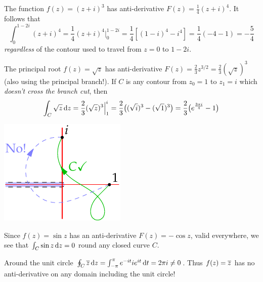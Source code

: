 \begin{examples}{}{}
	\exstart The function $f(z)=(z+i)^3$ has anti-derivative $F(z)=\frac 14(z+i)^4$. It follows that
	\[
		\int_0^{1-2i}(z+i)^4=\frac 14(z+i)^4\Big|_0^{1-2i}=\frac 14\left[(1-i)^4-i^4\right]=\frac 14(-4-1)=-\frac 54
	\]
	\emph{regardless} of the contour used to travel from $z=0$ to $1-2i$.

	\begin{enumerate}\setcounter{enumi}{1}
		\begin{minipage}[t]{0.76\linewidth}\vspace{-10pt}
		\item The principal root $f(z)=\sqrt{z}$ has anti-derivative $F(z)=\frac 23z^{3/2}=\frac 23(\sqrt z)^3$ (also using the principal branch!). If $C$ is any contour from $z_0=1$ to $z_1=i$ which \emph{doesn't cross the branch cut}, then
	  	\[
	  		\int_C\sqrt z\,{\mathrm{d} z}
	  		=\frac 23(\sqrt z)^3\Big|_1^i
	  		=\frac 23\bigl((\sqrt i)^3-(\sqrt 1)^3\bigr)
	  		=\frac 23\bigl(e^{\frac{3\pi i}{4}}-1\bigr)
	  	\]
		\end{minipage}
		\hfill
		\begin{minipage}[t]{0.23\linewidth}\vspace{-10pt}
			\flushright\includegraphics[scale=0.95]{contour-branch5}
		\end{minipage}
	  
	  \item Since $f(z)=\sin z$ has an anti-derivative $F(z)=-\cos z$, valid everywhere, we see that $\int_C\sin z\,{\mathrm{d} z}=0$ round any closed curve $C$.
	  
	  \item Around the unit circle $\oint_C\overline{z}\,{\mathrm{d} z}=\int_{-\pi}^\pi e^{-it}ie^{it}\,{\mathrm{d} t}=2\pi i\neq 0$. Thus $f(z)=\overline{z}$ has no anti-derivative on any domain including the unit circle!
	  

\end{enumerate}
\end{examples}
